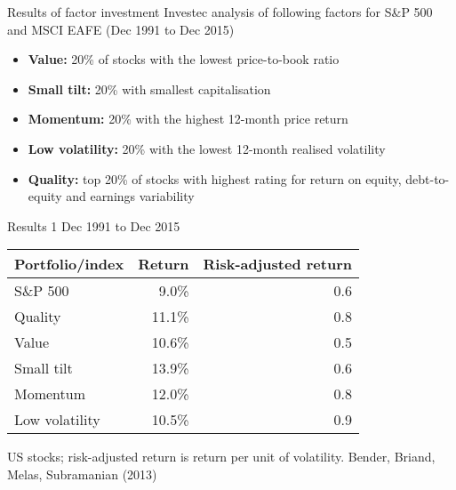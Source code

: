 \documentclass[14pt,xcolor=pdftex,dvipsnames,table]{beamer}\usepackage[]{graphicx}\usepackage[]{color}
\begin{document}
\begin{frame}{Results of factor investment}
Investec analysis of following factors for S\&P 500 and MSCI EAFE (Dec 1991 to Dec 2015)
\begin{itemize}[<+-| alert@+>]
\pause
\item \textbf{Value:} 20\% of stocks with the lowest price-to-book ratio
\item \textbf{Small tilt:} 20\% with smallest capitalisation
\item \textbf{Momentum:} 20\% with the highest 12-month price return
\item \textbf{Low volatility:} 20\% with the lowest 12-month realised volatility
\item \textbf{Quality:} top 20\% of stocks with highest rating for return on equity, debt-to-equity and earnings variability
\end{itemize}
\end{frame}

\begin{frame}{Results 1}
Dec 1991 to Dec 2015
\begin{table}
\begin{center}
\begin{tabular}{l r r }
\textbf{Portfolio/index} & \textbf{Return} & \textbf{Risk-adjusted return} \\
\hline
S\&P 500        & 9.0\% &  0.6\\
Quality         & 11.1\% & 0.8\\
Value           & 10.6\% & 0.5\\
Small tilt      & 13.9\% & 0.6\\
Momentum        & 12.0\% & 0.8\\
Low volatility &  10.5\% & 0.9\\
\end{tabular}
\end{center}
\end{table}
US stocks; risk-adjusted return is return per unit of volatility. Bender, Briand, Melas, Subramanian (2013)
\end{frame}
\end{document}

